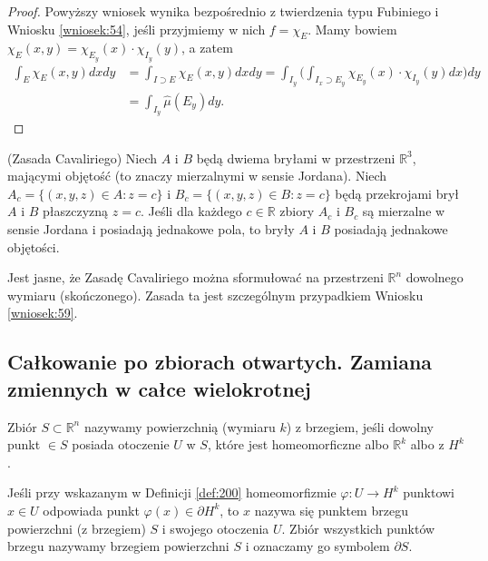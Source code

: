 \documentclass[leqno]{article}
\newcounter{defcounter}
\newcounter{uwagacounter}
\begin{document}
\begin{justify}
\begin{proof}
    Powyższy wniosek wynika bezpośrednio z twierdzenia typu Fubiniego i Wniosku \ref{wniosek:54}, jeśli przyjmiemy w nich $f = \chi_E$.
    Mamy bowiem $\chi_E(x,y) = \chi_{E_y}(x) \cdot \chi_{I_y}(y)$, a zatem 
    \[
        \begin{aligned}
            \int_{E} \chi_E(x,y)dxdy &= \int_{I \supset E}\chi_E(x,y)dxdy = \int_{I_y}\Big(\int_{I_x \supset E_y} \chi_{E_y}(x) \cdot \chi_{I_y}(y) dx \Big)dy \\
            &= \int_{I_y}\hat{\mu}(E_y)dy.
        \end{aligned}        
    \]
\end{proof}

\begin{wniosek}
{
    (Zasada Cavaliriego) Niech $A$ i $B$ będą dwiema bryłami w przestrzeni $\mathbb{R}^3$, mającymi objętość (to znaczy mierzalnymi w sensie Jordana).
    Niech $A_c = \{(x,y,z) \in A : z = c\}$ i $B_c = \{(x,y,z) \in B : z = c\}$ będą przekrojami brył $A$ i $B$ płaszczyzną $z = c$.
    Jeśli dla każdego $c \in \mathbb{R}$ zbiory $A_c$ i $B_c$ są mierzalne w sensie Jordana i posiadają jednakowe pola, to bryły $A$ i $B$ posiadają jednakowe objętości.
}
\end{wniosek}

Jest jasne, że Zasadę Cavaliriego można sformułować na przestrzeni $\mathbb{R}^n$ dowolnego wymiaru (skończonego). Zasada ta jest szczególnym przypadkiem Wniosku \ref{wniosek:59}.

\subsection{Całkowanie po zbiorach otwartych. Zamiana zmiennych w całce wielokrotnej}

\newpage

\setcounter{defcounter}{199}
\setcounter{uwagacounter}{104}

\begin{defn}
    Zbiór $S \subset \mathbb{R}^n$ nazywamy powierzchnią (wymiaru $k$) z brzegiem, jeśli dowolny punkt $ \in S$ posiada otoczenie $U$ w $S$,
    które jest homeomorficzne albo $\mathbb{R}^k$ albo z $H^k$. 
\end{defn}

\begin{defn}
    Jeśli przy wskazanym w Definicji \ref{def:200} homeomorfizmie $\varphi : U \to H^k$ punktowi $x \in U$ odpowiada punkt $\varphi(x) \in \partial H^k$, to 
    $x$ nazywa się punktem brzegu powierzchni (z brzegiem) $S$ i swojego otoczenia $U$. Zbiór wszystkich punktów brzegu nazywamy brzegiem powierzchni $S$ 
    i oznaczamy go symbolem $\partial S$. 
\end{defn}


\end{justify}
\end{document}
